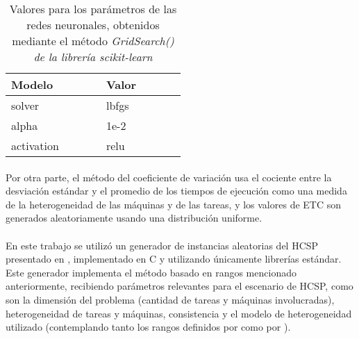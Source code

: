 \begin{table}[h!]

    \centering
    \begin{tabular}{ |p{0.25\linewidth}|p{0.25\linewidth}| } 
    \hline
    \textbf{Modelo} & \textbf{Valor}\\
    \hline
    solver & lbfgs\\ 
    \hline
    alpha & 1e-2\\ 
    \hline
    activation & relu\\ 
    \hline
    \end{tabular}
    \caption{ Valores para los parámetros de las redes neuronales, obtenidos mediante el método \textit{GridSearch() de la librería \textit{scikit-learn}}}
    \label{table:parametros}
    \end{table}

\paragraph{}Por otra parte, el método del coeficiente de variación usa el cociente entre la desviación estándar y el promedio de los tiempos de ejecución como una medida de la heterogeneidad de las máquinas y de las tareas, y los valores de ETC son generados aleatoriamente usando una distribución uniforme.

\paragraph{}En este trabajo se utilizó un generador de instancias aleatorias del HCSP presentado en \citet{bib-doctorado-nesmachnow}, implementado en C y utilizando únicamente librerías estándar. Este generador implementa el método basado en rangos mencionado anteriormente, recibiendo parámetros relevantes para el escenario de HCSP, como son la dimensión del problema (cantidad de tareas y máquinas involucradas), heterogeneidad de tareas y máquinas, consistencia y el modelo de heterogeneidad utilizado (contemplando tanto los rangos definidos por \citet{bib-ali-hc-etc} como por \citet{bib-braun}).





